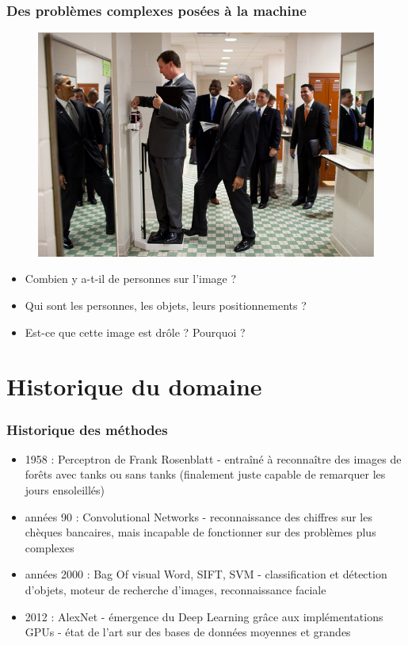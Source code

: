 \documentclass{beamer}
\begin{document}
\begin{frame}
\frametitle{Des problèmes complexes posées à la machine}

\begin{figure}[H]
 \centering
 \includegraphics[width=0.7\linewidth]{img/obamafunny.jpg}
\end{figure}
\begin{itemize}
	\item Combien y a-t-il de personnes sur l'image ?
	\item Qui sont les personnes, les objets, leurs positionnements ?
	\item Est-ce que cette image est drôle ? Pourquoi ?
\end{itemize}

\end{frame}



\section{Historique du domaine}

\begin{frame}
\frametitle{Historique des méthodes}
\begin{itemize}
\item 1958  : Perceptron de Frank Rosenblatt - entraîné à reconnaître des images de forêts avec tanks ou sans tanks (finalement juste capable de remarquer les jours ensoleillés)
\item années 90 : Convolutional Networks - reconnaissance des chiffres sur les chèques bancaires, mais incapable de fonctionner sur des problèmes plus complexes
\item années 2000 : Bag Of visual Word, SIFT, SVM - classification et détection d'objets, moteur de recherche d'images, reconnaissance faciale
\item 2012 : AlexNet - émergence du Deep Learning grâce aux implémentations GPUs - état de l'art sur des bases de données moyennes et grandes
\end{itemize}

\end{frame}
\end{document}
